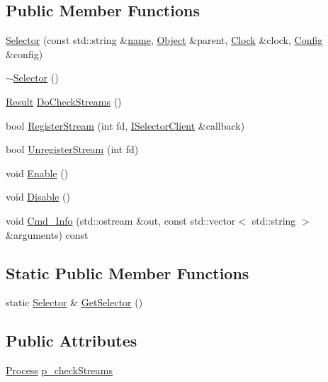 \subsection*{Public Member Functions}
\begin{DoxyCompactItemize}
\item 
\hyperlink{class_simulator_1_1_selector_a42e1be9775ecccbf1c2d42c5be34af39}{Selector} (const std\+::string \&\hyperlink{mtconf_8c_a8f8f80d37794cde9472343e4487ba3eb}{name}, \hyperlink{class_simulator_1_1_object}{Object} \&parent, \hyperlink{class_simulator_1_1_clock}{Clock} \&clock, \hyperlink{class_config}{Config} \&config)
\item 
\hyperlink{class_simulator_1_1_selector_a8e982483f22f8b855a4ecb144f8f5fde}{$\sim$\+Selector} ()
\item 
\hyperlink{namespace_simulator_a4b6b5616e7236c0c131516a441776805}{Result} \hyperlink{class_simulator_1_1_selector_aedd65203d5ff01f8231f610d2dec41f2}{Do\+Check\+Streams} ()
\item 
bool \hyperlink{class_simulator_1_1_selector_af5b2530a3285a2f07e3190d0084c982c}{Register\+Stream} (int fd, \hyperlink{class_simulator_1_1_i_selector_client}{I\+Selector\+Client} \&callback)
\item 
bool \hyperlink{class_simulator_1_1_selector_a8ef0c07e2dd178215f80350f9869d669}{Unregister\+Stream} (int fd)
\item 
void \hyperlink{class_simulator_1_1_selector_ae0fb5786cddb09a3cbd03829ca83f6bd}{Enable} ()
\item 
void \hyperlink{class_simulator_1_1_selector_a93cd45f75c2ff1c4360f41d15bda9c9f}{Disable} ()
\item 
void \hyperlink{class_simulator_1_1_selector_afb30d58e41798e7f58d907a67ced8fe7}{Cmd\+\_\+\+Info} (std\+::ostream \&out, const std\+::vector$<$ std\+::string $>$ \&arguments) const 
\end{DoxyCompactItemize}
\subsection*{Static Public Member Functions}
\begin{DoxyCompactItemize}
\item 
static \hyperlink{class_simulator_1_1_selector}{Selector} \& \hyperlink{class_simulator_1_1_selector_a8a24708be2a73ff30ab732429bf9bc10}{Get\+Selector} ()
\end{DoxyCompactItemize}
\subsection*{Public Attributes}
\begin{DoxyCompactItemize}
\item 
\hyperlink{class_simulator_1_1_process}{Process} \hyperlink{class_simulator_1_1_selector_a900ed591c589996cd3a805ed96cf4d63}{p\+\_\+check\+Streams}
\end{DoxyCompactItemize}


